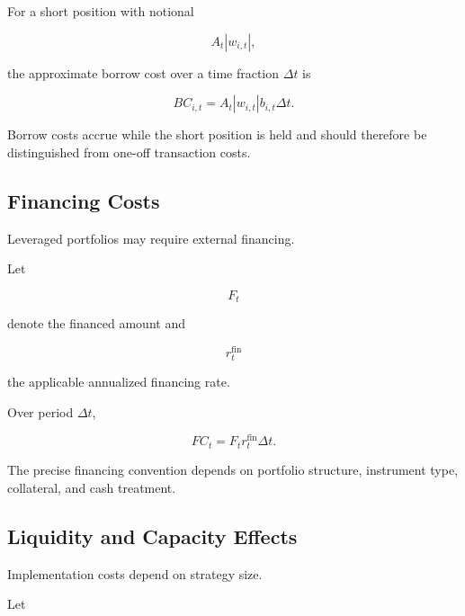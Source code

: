 \documentclass[11pt,a4paper]{article}
\begin{document}
For a short position with notional

\begin{equation}
A_t|w_{i,t}|,
\end{equation}

the approximate borrow cost over a time fraction $\Delta t$ is

\begin{equation}
\boxed{
BC_{i,t}
=
A_t
|w_{i,t}|
b_{i,t}
\Delta t.
}
\end{equation}

Borrow costs accrue while the short position is held and should therefore be
distinguished from one-off transaction costs.


\subsection{Financing Costs}

Leveraged portfolios may require external financing.

Let

\begin{equation}
F_t
\end{equation}

denote the financed amount and

\begin{equation}
r_t^{\mathrm{fin}}
\end{equation}

the applicable annualized financing rate.

Over period $\Delta t$,

\begin{equation}
\boxed{
FC_t
=
F_t
r_t^{\mathrm{fin}}
\Delta t.
}
\end{equation}

The precise financing convention depends on portfolio structure, instrument
type, collateral, and cash treatment.


\subsection{Liquidity and Capacity Effects}

Implementation costs depend on strategy size.

Let
\end{document}
